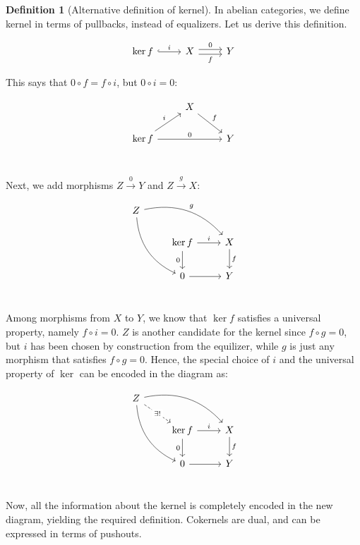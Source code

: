 \documentclass[10pt]{amsart}
\newcommand{\8}{\ensuremath{\infty}}
\newcommand{\0}{\ensuremath{\overset{\rightarrow}{0}}}
\newcommand{\1}{\ensuremath{\mathbf{1}}}
\theoremstyle{definition}
\newtheorem{definition}{Definition}[section]
\numberwithin{definition}{subsection}
\numberwithin{definition}{section}
\begin{document}
\begin{definition}[Alternative definition of kernel\label{def:abker}]
  In abelian categories, we define kernel in terms of pullbacks, instead of equalizers. Let us derive this definition.

  \begin{equation*}
    \begin{tikzcd}
      \ker f \arrow[r, hookrightarrow, "i"] & X \arrow[r, "0", shift left] \arrow[r, "f"', shift right] & Y
    \end{tikzcd}
  \end{equation*}

  This says that $0 \circ f = f \circ i$, but $0 \circ i = 0$:

  \begin{equation*}
    \begin{tikzcd}
      & X \arrow[dr, "f"] & \\
      \ker f \arrow[ru, "i"] \arrow[rr, "0"] & & Y \\
    \end{tikzcd}
  \end{equation*}

  Next, we add morphisms $Z \overset{0}{\rightarrow} Y$ and $Z \overset{g}{\rightarrow} X$:

  \begin{equation*}
    \begin{tikzcd}
      Z \arrow[ddr, bend right] \arrow[drr, bend left, "g"] & & \\
      & \ker f \arrow[d, "0"'] \arrow[r, "i"] & X \arrow[d, "f"] \\
      & 0 \arrow[r] & Y \\
    \end{tikzcd}
  \end{equation*}

  Among morphisms from $X$ to $Y$, we know that $\ker f$ satisfies a universal property, namely $f \circ i = 0$. $Z$ is another candidate for the kernel since $f \circ g = 0$, but $i$ has been chosen by construction from the equilizer, while $g$ is just any morphism that satisfies $f \circ g = 0$. Hence, the special choice of $i$ and the universal property of $\ker$ can be encoded in the diagram as:

  \begin{equation*}
    \begin{tikzcd}
      Z \arrow[ddr, bend right] \arrow[dr, dashed, "\exists!" description] \arrow[drr, bend left] & & \\
      & \ker f \arrow[d, "0"'] \arrow[r, "i"] & X \arrow[d, "f"] \\
      & 0 \arrow[r] & Y \\
    \end{tikzcd}
  \end{equation*}

  Now, all the information about the kernel is completely encoded in the new diagram, yielding the required definition. Cokernels are dual, and can be expressed in terms of pushouts.
\end{definition}
\end{document}
